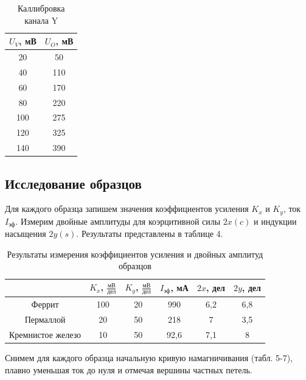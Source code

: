 \documentclass[a4paper]{article}
\theoremstyle{definition}
\theoremstyle{remark}
\begin{document}
    \begin{table}[h!]
        \centering
        \caption{Каллибровка канала Y}
        \begin{tabular}{|c|c|}
        \hline
        $U_V$, мВ & $U_O$, мВ \\ \hline
        20    & 50    \\ \hline
        40    & 110   \\ \hline
        60    & 170   \\ \hline
        80    & 220   \\ \hline
        100   & 275   \\ \hline
        120   & 325   \\ \hline
        140   & 390   \\ \hline
        \end{tabular}
        \end{table}

\subsection{Исследование образцов}

Для каждого образца запишем значения коэффициентов усиления $K_{x}$ и $K_{y}$, ток $I_{\text{эф}}$. Измерим двойные амплитуды для коэрцитивной силы $2x(c)$ и индукции насыщения $2y(s)$. Результаты представлены в таблице 4.

\begin{table}[h!]
    \centering
    \caption{Результаты измерения коэффициентов усиления и двойных амплитуд образцов}
    \begin{tabular}{|c|c|c|c|c|c|}
    \hline
                      & $K_x$, $\frac{\text{мВ}}{\text{дел}}$ & $K_y$, $\frac{\text{мВ}}{\text{дел}}$ & $I_{\text{эф}}$, мА & $2x$, дел & $2y$, дел \\ \hline
    Феррит            & 100   & 20    & 990                 & 6,2       & 6,8       \\ \hline
    Пермаллой         & 20    & 50    & 218                 & 7         & 3,5       \\ \hline
    Кремнистое железо & 10    & 50    & 92,6                & 7,1       & 8         \\ \hline
    \end{tabular}
\end{table}
 	
Снимем для каждого образца начальную кривую намагничивания (табл. 5-7), плавно уменьшая ток до нуля и отмечая вершины частных петель.
\end{document}

